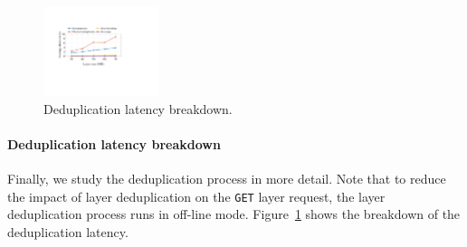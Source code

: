 \begin{figure}[t]
	\centering
	\includegraphics[width=0.3\textwidth]{graphs/dedupbreakdown.pdf}
	\caption{Deduplication latency breakdown.}
	\label{fig:eval-dedupbreakdown}
\end{figure}

\paragraph{Deduplication latency breakdown}
%
Finally, we study the deduplication process in more detail.
%
Note that to reduce the impact of layer deduplication on the \texttt{GET} layer request,
the layer deduplication process runs in off-line mode.
%
Figure~\ref{fig:eval-dedupbreakdown} shows the breakdown of the deduplication latency.

